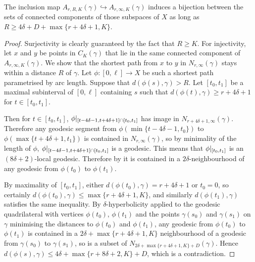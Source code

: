 \begin{lem}\label{lem:replaceinftybyR} The inclusion map $A_{r, R, K}(\gamma)
\hookrightarrow A_{r, \infty, K}(\gamma)$ induces a bijection between the sets
of connected components of those subspaces of $X$ as long as $R \geq 4\delta + D +
\max\{r + 4\delta + 1, K\}$.\end{lem}

\begin{proof} Surjectivity is clearly guaranteed by the fact that $R \geq K$.
For injectivity, let $x$ and $y$ be points in $C_K(\gamma)$ that lie in the
same connected component of $A_{r, \infty, K}(\gamma)$. We show that the
shortest path from $x$ to $y$ in $N_{r, \infty}(\gamma)$ stays within a
distance $R$ of $\gamma$. Let $\phi\colon [0,\ell] \to X$ be such a
shortest path parametrised by arc length. Suppose that $d(\phi(s),\gamma) >
R$. Let $[t_0,t_1]$ be a maximal subinterval of $[0, \ell]$ containing $s$
such that $d(\phi(t),\gamma) \geq r + 4\delta + 1$ for $t \in [t_0,t_1]$. 

Then for $t \in [t_0,t_1]$, $\phi\vert_{[t-4\delta-1,t+4\delta+1]
\cap[t_0, t_1]}$ has image in $N_{r+4\delta+1, \infty}(\gamma)$.
Therefore any geodesic segment from $\phi(\min\{t-4\delta-1, t_0\})$ to
$\phi(\max\{t+4\delta+1, t_1\})$ is contained in $N_{r, \infty}(\gamma)$, so by
minimality of the length of $\phi$, $\phi\vert_{[t-4\delta-1,t+4\delta+1]
\cap [t_0, t_1]}$ is a geodesic. This means that
$\phi\vert_{[t_0,t_1]}$ is an $(8\delta+2)$-local geodesic. Therefore by
\cite[III.H.1.13]{bridsonhaefliger99} it is contained in a
$2\delta$-neighbourhood of any geodesic from $\phi(t_0)$ to $\phi(t_1)$.

By maximality of $[t_0,t_1]$, either $d(\phi(t_0),\gamma) = r + 4\delta+1$ or
$t_0=0$, so certainly $d(\phi(t_0),\gamma) \leq \max\{r+4\delta+1,K\}$, and
similarly $d(\phi(t_1),\gamma)$ satisfies the same inequality. By
$\delta$-hyperbolicity applied to the geodesic quadrilateral with vertices
$\phi(t_0)$, $\phi(t_1)$ and the points $\gamma(s_0)$ and $\gamma(s_1)$ on
$\gamma$ minimising the distances to $\phi(t_0)$ and $\phi(t_1)$, any geodesic
from $\phi(t_0)$ to $\phi(t_1)$ is contained in a $2\delta + \max\{r + 4\delta
+ 1, K\}$ neighbourhood of a geodesic from $\gamma(s_0)$ to $\gamma(s_1)$, so
is a subset of $N_{2\delta+\max\{r+4\delta+1, K\} + D}(\gamma)$. Hence
$d(\phi(s),\gamma) \leq 4\delta + \max\{r+8\delta+2,K\} + D$, which is a
contradiction.  \end{proof}

